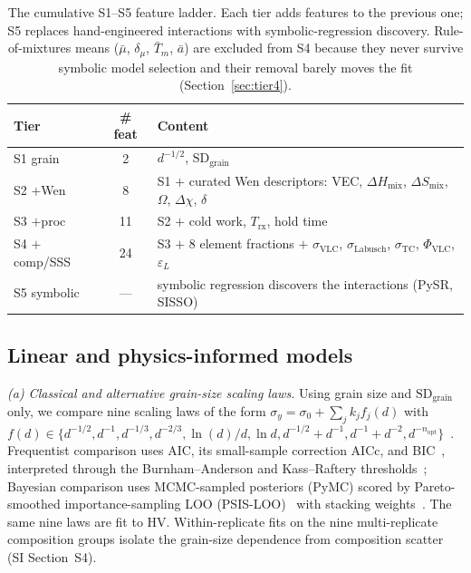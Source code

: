 \documentclass[5p,times,twocolumn]{elsarticle}
\begin{document}
\begin{table}[t]
\centering
\caption{The cumulative S1--S5 feature ladder. Each tier adds features to the previous one; S5 replaces hand-engineered interactions with symbolic-regression discovery. Rule-of-mixtures means ($\bar{\mu}$, $\delta_\mu$, $\bar{T}_m$, $\bar{a}$) are excluded from S4 because they never survive symbolic model selection and their removal barely moves the fit (Section~\ref{sec:tier4}).}
\label{tab:ladder}
\footnotesize
\setlength{\tabcolsep}{4pt}
\begin{tabular}{@{}lcp{4.6cm}@{}}
\toprule
Tier & \# feat & Content \\
\midrule
S1 grain & 2 & $d^{-1/2}$, $\text{SD}_\text{grain}$ \\
S2 $+$Wen & 8 & S1 $+$ curated Wen descriptors: VEC, $\Delta H_\text{mix}$, $\Delta S_\text{mix}$, $\Omega$, $\Delta\chi$, $\delta$ \\
S3 $+$proc & 11 & S2 $+$ cold work, $T_\text{rx}$, hold time \\
S4 $+$comp/SSS & 24 & S3 $+$ 8 element fractions $+$ $\sigma_\text{VLC}$, $\sigma_\text{Labusch}$, $\sigma_\text{TC}$, $\Phi_\text{VLC}$, $\varepsilon_L$ \\
S5 symbolic & --- & symbolic regression discovers the interactions (PySR, SISSO) \\
\bottomrule
\end{tabular}
\end{table}

\subsection{Linear and physics-informed models}
\label{sec:methods_linear}

\emph{(a) Classical and alternative grain-size scaling laws.} 
Using grain size and $\text{SD}_\text{grain}$ only, we compare nine scaling laws of the form $\sigma_y = \sigma_0 + \sum_j k_j f_j(d)$ with $f(d) \in \{d^{-1/2}, d^{-1}, d^{-1/3}, d^{-2/3}, \ln(d)/d, \ln d, d^{-1/2}{+}d^{-1}, d^{-1}{+}d^{-2}, d^{-n_\text{opt}}\}$~\cite{Hall1951,Petch1953,Dunstan2014,Baldwin1958,Li2016HP}. Frequentist comparison uses AIC, its small-sample correction AICc, and BIC~\cite{Akaike1974,Schwarz1978}, interpreted through the Burnham--Anderson and Kass--Raftery thresholds~\cite{BurnhamAnderson2002,KassRaftery1995}; Bayesian comparison uses MCMC-sampled posteriors (PyMC) scored by Pareto-smoothed importance-sampling LOO (PSIS-LOO)~\cite{Vehtari2017} with stacking weights~\cite{Yao2018}. The same nine laws are fit to HV. Within-replicate fits on the nine multi-replicate composition groups isolate the grain-size dependence from composition scatter (SI Section~S4).
\end{document}
